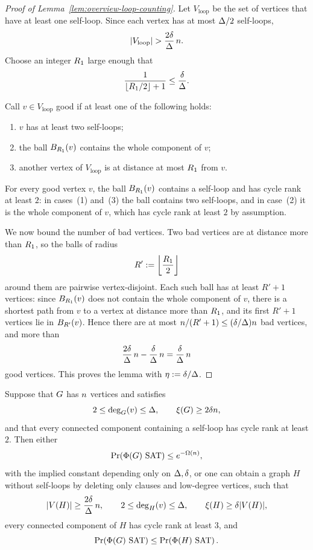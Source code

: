 \begin{proof}[Proof of Lemma~\ref{lem:overview-loop-counting}]
Let \(V_{\mathrm{loop}}\) be the set of vertices that have at least one
self-loop. Since each vertex has at most \(\Delta/2\) self-loops,
\[
  |V_{\mathrm{loop}}|>\frac{2\excd}{\degb}\,\nvert .
\]
Choose an integer \(R_1\) large enough that
\[
  \frac1{\lfloor R_1/2\rfloor+1}\le\frac{\delta}{\Delta}.
\]

Call \(v\in V_{\mathrm{loop}}\) good if at least one of the following holds:
\begin{enumerate}[label=(\arabic*),leftmargin=3em]
\item \(v\) has at least two self-loops;
\item the ball \(B_{R_1}(v)\) contains the whole component of \(v\);
\item another vertex of \(V_{\mathrm{loop}}\) is at distance at most \(R_1\) from \(v\).
\end{enumerate}
For every good vertex \(v\), the ball \(B_{R_1}(v)\) contains a self-loop
and has cycle rank at least \(2\): in cases~(1) and~(3) the ball contains two
self-loops, and in case~(2) it is the whole component of \(v\), which has
cycle rank at least \(2\) by assumption.

We now bound the number of bad vertices. Two bad vertices are at distance more
than \(R_1\), so the balls of radius
\[
  R':=\left\lfloor\frac{R_1}2\right\rfloor
\]
around them are pairwise vertex-disjoint. Each such ball has at least \(R'+1\)
vertices: since \(B_{R_1}(v)\) does not contain the whole component of
\(v\), there is a shortest path from \(v\) to a vertex at distance more than
\(R_1\), and its first \(R'+1\) vertices lie in \(B_{R'}(v)\). Hence there
are at most \(n/(R'+1)\le(\delta/\Delta)n\) bad vertices, and more than
\[
  \frac{2\delta}{\Delta}\,n-\frac{\delta}{\Delta}\,n
  =\frac{\delta}{\Delta}\,n
\]
good vertices. This proves the lemma with \(\eta:=\delta/\Delta\).
\end{proof}

\begin{lemma}\label{lem:remove-loops}
Suppose that \(G\) has \(n\) vertices and satisfies
\[
  2\le\deg_{G}(v)\le\Delta,
  \qquad
  \xi(G)\ge2\delta n,
\]
and that every connected component containing a self-loop has cycle rank at
least \(2\). Then either
\[
  \Prx{\rform{\Gin}\SAT}\le e^{-\Omega(\nvert)},
\]
with the implied constant depending only on \(\Delta,\delta\), or one can obtain
a graph \(H\) without self-loops by deleting only clauses and low-degree
vertices, such that
\[
  |V(H)|\ge\frac{2\delta}{\Delta}\,n,
  \qquad
  2\le\deg_{H}(v)\le\Delta,
  \qquad
  \xi(H)\ge\delta|V(H)|,
\]
every connected component of \(H\) has cycle rank at least \(3\), and
\[
  \Prx{\rform{\Gin}\SAT}
  \le
  \Prx{\rform{H}\SAT}.
\]
\end{lemma}

